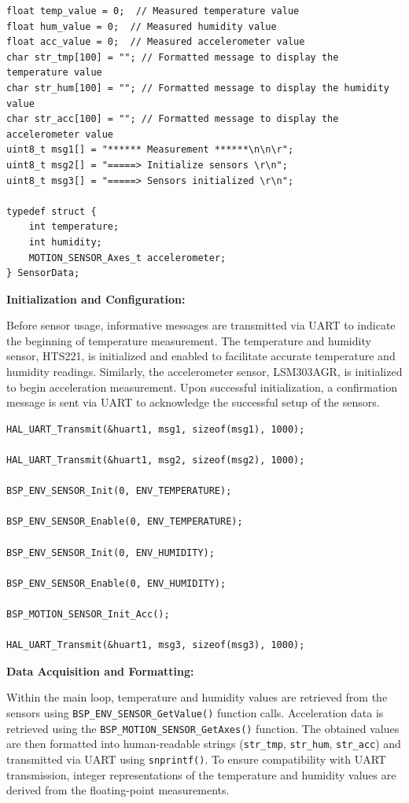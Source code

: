 \begin{lstlisting}[caption={Declaration of Variables}]
float temp_value = 0;  // Measured temperature value
float hum_value = 0;  // Measured humidity value
float acc_value = 0;  // Measured accelerometer value
char str_tmp[100] = ""; // Formatted message to display the temperature value
char str_hum[100] = ""; // Formatted message to display the humidity value
char str_acc[100] = ""; // Formatted message to display the accelerometer value
uint8_t msg1[] = "****** Measurement ******\n\n\r";
uint8_t msg2[] = "=====> Initialize sensors \r\n";
uint8_t msg3[] = "=====> Sensors initialized \r\n";

typedef struct {
    int temperature;
    int humidity;
    MOTION_SENSOR_Axes_t accelerometer;
} SensorData;
\end{lstlisting}

\textbf{Initialization and Configuration:}

Before sensor usage, informative messages are transmitted via UART to indicate the beginning of temperature measurement.
The temperature and humidity sensor, HTS221, is initialized and enabled to facilitate accurate temperature and humidity readings.
Similarly, the accelerometer sensor, LSM303AGR, is initialized to begin acceleration measurement.
Upon successful initialization, a confirmation message is sent via UART to acknowledge the successful setup of the sensors.

\begin{lstlisting}[caption={Initialization and Configuration}]
HAL_UART_Transmit(&huart1, msg1, sizeof(msg1), 1000);

HAL_UART_Transmit(&huart1, msg2, sizeof(msg2), 1000);

BSP_ENV_SENSOR_Init(0, ENV_TEMPERATURE);

BSP_ENV_SENSOR_Enable(0, ENV_TEMPERATURE);

BSP_ENV_SENSOR_Init(0, ENV_HUMIDITY);

BSP_ENV_SENSOR_Enable(0, ENV_HUMIDITY);

BSP_MOTION_SENSOR_Init_Acc();

HAL_UART_Transmit(&huart1, msg3, sizeof(msg3), 1000);
\end{lstlisting}

\textbf{Data Acquisition and Formatting:}

Within the main loop, temperature and humidity values are retrieved from the sensors using \lstinline{BSP_ENV_SENSOR_GetValue()} function calls.
Acceleration data is retrieved using the \lstinline{BSP_MOTION_SENSOR_GetAxes()} function.
The obtained values are then formatted into human-readable strings (\lstinline{str_tmp}, \lstinline{str_hum}, \lstinline{str_acc}) and transmitted via UART using \lstinline{snprintf()}.
To ensure compatibility with UART transmission, integer representations of the temperature and humidity values are derived from the floating-point measurements.

